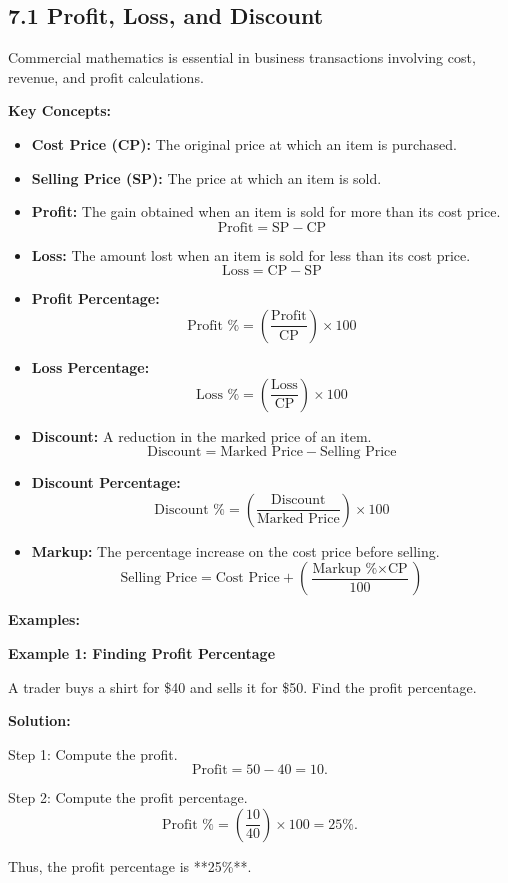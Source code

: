 
\subsection*{7.1 Profit, Loss, and Discount}
Commercial mathematics is essential in business transactions involving cost, revenue, and profit calculations.

\textbf{Key Concepts:}
\begin{itemize}
	\item \textbf{Cost Price (CP):} The original price at which an item is purchased.
	\item \textbf{Selling Price (SP):} The price at which an item is sold.
	\item \textbf{Profit:} The gain obtained when an item is sold for more than its cost price.
	\[
	\text{Profit} = \text{SP} - \text{CP}
	\]
	\item \textbf{Loss:} The amount lost when an item is sold for less than its cost price.
	\[
	\text{Loss} = \text{CP} - \text{SP}
	\]
	\item \textbf{Profit Percentage:}
	\[
	\text{Profit \%} = \left( \frac{\text{Profit}}{\text{CP}} \right) \times 100
	\]
	\item \textbf{Loss Percentage:}
	\[
	\text{Loss \%} = \left( \frac{\text{Loss}}{\text{CP}} \right) \times 100
	\]
	\item \textbf{Discount:} A reduction in the marked price of an item.
	\[
	\text{Discount} = \text{Marked Price} - \text{Selling Price}
	\]
	\item \textbf{Discount Percentage:}
	\[
	\text{Discount \%} = \left( \frac{\text{Discount}}{\text{Marked Price}} \right) \times 100
	\]
	\item \textbf{Markup:} The percentage increase on the cost price before selling.
	\[
	\text{Selling Price} = \text{Cost Price} + \left( \frac{\text{Markup \%} \times \text{CP}}{100} \right)
	\]
\end{itemize}

\textbf{Examples:}

\begin{flushleft}
	\textbf{Example 1: Finding Profit Percentage}
	
	A trader buys a shirt for \$40 and sells it for \$50. Find the profit percentage.
	
	\textbf{Solution:}
	
	Step 1: Compute the profit.
	\[
	\text{Profit} = 50 - 40 = 10.
	\]
	
	Step 2: Compute the profit percentage.
	\[
	\text{Profit \%} = \left( \frac{10}{40} \right) \times 100 = 25\%.
	\]
	
	Thus, the profit percentage is **25\%**.
\end{flushleft}

